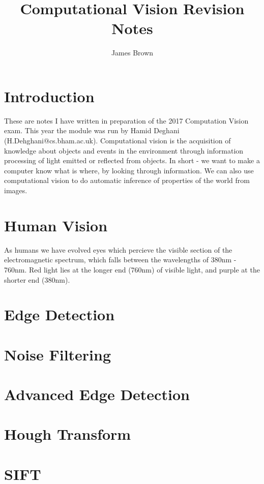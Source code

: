 \documentclass{article}
\title{Computational Vision \linebreak Revision Notes}
\author{James Brown}
\begin{document}
	\maketitle
	\newpage
	\tableofcontents
	\newpage
	
	\section{Introduction}
	These are notes I have written in preparation of the 2017 Computation Vision exam. This year the module was run by Hamid Deghani (H.Dehghani@cs.bham.ac.uk).
	\linebreak \linebreak
	Computational vision is the acquisition of knowledge about objects and events in the environment through information processing of light emitted or reflected from objects. In short - we want to make a computer know what is where, by looking through information. We can also use computational vision to do automatic inference of properties of the world from images.
	
	\section{Human Vision}
	As humans we have evolved eyes which percieve the visible section of the electromagnetic spectrum, which falls between the wavelengths of 380nm - 760nm. Red light lies at the longer end (760nm) of visible light, and purple at the shorter end (380nm).
	
	\section{Edge Detection}
	
	\section{Noise Filtering}
	
	\section{Advanced Edge Detection}
	
	\section{Hough Transform}
	
	\section{SIFT}
	
\end{document}
